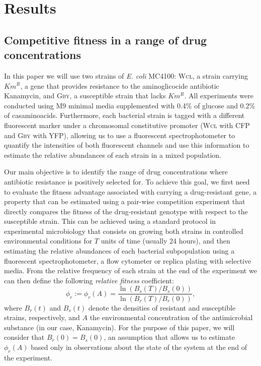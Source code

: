 \documentclass[fleqn,12pt]{wlscirep}
\begin{document}
\section*{Results}

\subsection*{Competitive fitness in a range of drug concentrations}

In this paper we will use two strains of \textit{E. coli} MC4100\cite{Chait2007,Chait2010}: \textsc{Wcl}, a strain carrying $Km^R$, a gene that provides resistance to the aminoglicocide antibiotic Kanamycin, and \textsc{Gby}, a susceptible strain that lacks $Km^R$. All experiments were conducted using M9 minimal media supplemented with 0.4\% of glucose and 0.2\%  of casaminoacids. 
Furthermore, each bacterial strain is tagged with a different fluorescent marker under a chromosomal constitutive promoter (\textsc{Wcl} with CFP and \textsc{Gby} with YFP), allowing us to use a fluorescent spectrophotometer to quantify the intensities of both fluorescent channels and use this information to estimate the relative abundances of each strain in a mixed population.

Our main objective is to identify the range of drug concentrations where antibiotic resistance is positively selected for. To achieve this goal, we first need to evaluate the fitness advantage associated with carrying a drug-resistant gene, a property that can be estimated using a pair-wise competition experiment that directly compares the fitness of the drug-resistant genotype with respect to the susceptible strain. This can be achieved using a standard protocol in experimental microbiology that consists on growing both strains in controlled environmental conditions for $T$ units of time (usually 24 hours), and then estimating the relative abundances of each bacterial subpopulation using a fluorescent spectrophotometer, a flow cytometer or replica plating with selective media. From the relative frequency of each strain at the end of the experiment we can then define the following {\em relative fitness} coefficient:
\begin{equation}
\phi_r := \phi_r(A)= \frac{\ln(B_s(T)/B_s(0))}{\ln(B_r(T)/B_r(0))},\label{eq:phi}
\end{equation}\vspace{-0pt}
where $B_r(t)$ and $B_s(t)$ denote the densities of resistant and susceptible strains, respectively, and $A$ the environmental concentration of the antimicrobial substance (in our case, Kanamycin).  For the purpose of this paper, we will consider that $B_r(0)=B_s(0)$, an assumption that allows us to estimate $\phi_r(A)$ based only in observations about the state of the system at the end of the experiment. 
\end{document}
